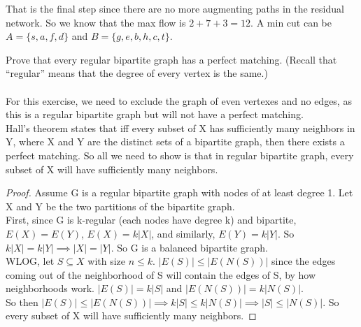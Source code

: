 \documentclass[12pt]{article}
\newenvironment{exercise}[2][Exercise]{\begin{trivlist}
		\item[\hskip \labelsep {\bfseries #1}\hskip \labelsep {\bfseries #2.}]}{\end{trivlist}}
\begin{document}
\begin{exercise}{1}
		That is the final step since there are no more augmenting paths in the residual network. So we know that the max flow is $2+7+3=12$. A min cut can be $A=\{s,a,f,d\}$ and $B=\{g,e,b,h,c,t\}$.\\
		
	\end{exercise}
	
	\begin{exercise}{2} Prove that every regular bipartite graph has a perfect matching.  (Recall that ``regular'' means that the degree of every vertex is the same.)\\\\
		For this exercise, we need to exclude the graph of even vertexes and no edges, as this is a regular bipartite graph but will not have a perfect matching.\\ 
		Hall's theorem states that iff every subset of X has sufficiently many neighbors in Y, where X and Y are the distinct sets of a bipartite graph, then there exists a perfect matching. So all we need to show is that in regular bipartite graph, every subset of X will have sufficiently many neighbors.
		\begin{proof}
			Assume G is a regular bipartite graph with nodes of at least degree 1. Let X and Y be the two partitions of the bipartite graph.\\
			First, since G is k-regular (each nodes have degree k) and bipartite, $E(X)=E(Y)$, $E(X) = k|X|$, and similarly, $E(Y)=k|Y|$. So $k|X|=k|Y| \implies |X|=|Y|$. So G is a balanced bipartite graph.\\
			WLOG, let $S\subseteq X$ with size $n\leq k$. $|E(S)| \leq |E(N(S))|$ since the edges coming out of the neighborhood of S will contain the edges of S, by how neighborhoods work. $|E(S)| = k|S|$ and $|E(N(S))| =  k|N(S)|$.\\
			So then $|E(S)| \leq |E(N(S))| \implies k|S|\leq k|N(S)| \implies |S|\leq |N(S)|$. So every subset of X will have sufficiently many neighbors.
		\end{proof}
	\end{exercise}
	
\end{document}
